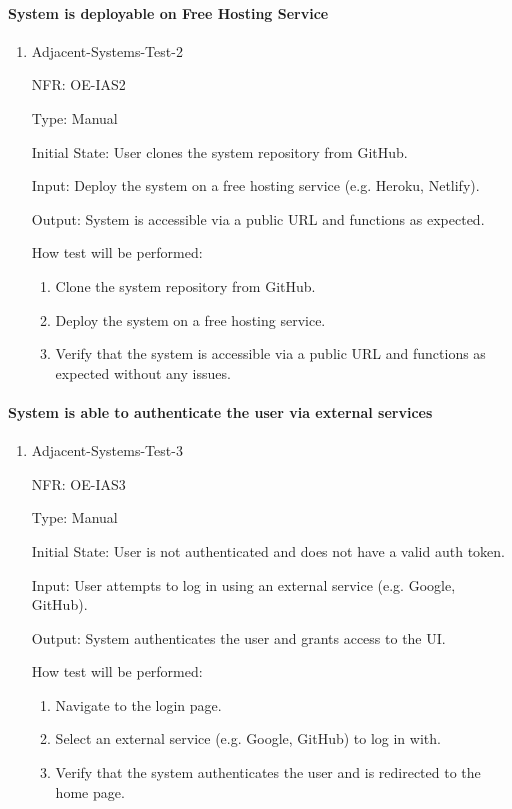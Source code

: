 \documentclass[12pt, titlepage]{article}
\begin{document}
\paragraph{System is deployable on Free Hosting Service}
\begin{enumerate}
  \item{Adjacent-Systems-Test-2}

  NFR: OE-IAS2

  Type: Manual
            
  Initial State: User clones the system repository from GitHub.
            
  Input:  Deploy the system on a free hosting service (e.g. Heroku, Netlify).
            
  Output: System is accessible via a public URL and functions as expected.
            
  How test will be performed: 
  \begin{enumerate}
    \item Clone the system repository from GitHub.
    \item Deploy the system on a free hosting service.
    \item Verify that the system is accessible via a public URL and functions as expected without any issues.
  \end{enumerate}
\end{enumerate}

\paragraph{System is able to authenticate the user via external services}
\begin{enumerate}
  \item{Adjacent-Systems-Test-3}

  NFR: OE-IAS3

  Type: Manual
            
  Initial State: User is not authenticated and does not have a valid auth token.
            
  Input: User attempts to log in using an external service (e.g. Google, GitHub).
            
  Output: System authenticates the user and grants access to the UI.
            
  How test will be performed: 
  \begin{enumerate}
    \item Navigate to the login page.
    \item Select an external service (e.g. Google, GitHub) to log in with.
    \item Verify that the system authenticates the user and is redirected to the home page.
  \end{enumerate}
\end{enumerate}
\end{document}
